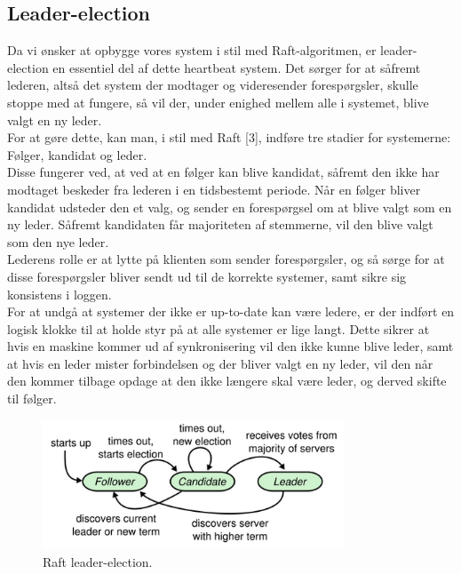 \documentclass[a4paper,12pt]{article}
\begin{document}
\subsection{Leader-election} 
Da vi ønsker at opbygge vores system i stil med Raft-algoritmen, er leader-election en essentiel del af dette heartbeat system. Det sørger for at såfremt lederen, altså det system der modtager og videresender forespørgsler, skulle stoppe med at fungere, så vil der, under enighed mellem alle i systemet, blive valgt en ny leder.
\\
For at gøre dette, kan man, i stil med Raft [3], indføre tre stadier for systemerne:
\\
Følger, kandidat og leder.
\\[5px]
Disse fungerer ved, at ved at en følger kan blive kandidat, såfremt den ikke har modtaget beskeder fra lederen i en tidsbestemt periode. Når en følger bliver kandidat udsteder den et valg, og sender en forespørgsel om at blive valgt som en ny leder. Såfremt kandidaten får majoriteten af stemmerne, vil den blive valgt som den nye leder.
\\
Lederens rolle er at lytte på klienten som sender forespørgsler, og så sørge for at disse forespørgsler bliver sendt ud til de korrekte systemer, samt sikre sig konsistens i loggen.
\\
For at undgå at systemer der ikke er up-to-date kan være ledere, er der indført en logisk klokke til at holde styr på at alle systemer er lige langt. 
Dette sikrer at hvis en maskine kommer ud af synkronisering vil den ikke kunne blive leder, samt at hvis en leder mister forbindelsen og der bliver valgt en ny leder, vil den når den kommer tilbage opdage at den ikke længere skal være leder, og derved skifte til følger.
\\
\begin{figure}[H]
  \caption{Raft leader-election.}
  \centering
    \includegraphics[width=0.8\textwidth]{Raftleaderelection.png}
\end{figure}
\end{document}
